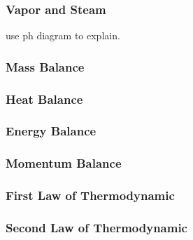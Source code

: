 \subsubsection*{Vapor and Steam}\label{app:Vapor}
use ph diagram to explain.
\subsubsection*{Mass Balance}\label{app:Mass_B}
\subsubsection*{Heat Balance}\label{app:Heat_B}
\subsubsection*{Energy Balance}\label{app:Energy_B}
\subsubsection*{Momentum Balance}\label{app:Momentum_B}
\subsubsection*{First Law of Thermodynamic}\label{app:flt}
\subsubsection*{Second Law of Thermodynamic}\label{app:slt}